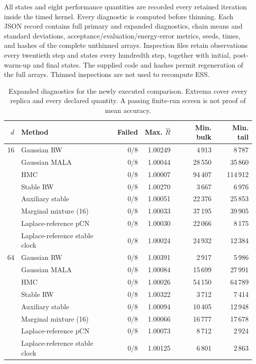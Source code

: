 \documentclass[11pt]{article}
\theoremstyle{definition}\newtheorem{definition}[theorem]{Definition}
\theoremstyle{remark}\newtheorem{remark}[theorem]{Remark}
\numberwithin{equation}{section}
\newcommand{\1}{\mathbf 1}
\begin{document}
All states and eight performance quantities are recorded every retained iteration inside the timed kernel. Every diagnostic is computed before thinning. Each JSON record contains full primary and expanded diagnostics, chain means and standard deviations, acceptance/evaluation/energy-error metrics, seeds, times, and hashes of the complete unthinned arrays. Inspection files retain observations every twentieth step and states every hundredth step, together with initial, post-warm-up and final states. The supplied code and hashes permit regeneration of the full arrays. Thinned inspections are not used to recompute ESS.
\begin{table}[tb]\centering\footnotesize\setlength{\tabcolsep}{4pt}
\caption{Expanded diagnostics for the newly executed comparison. Extrema cover every replica and every declared quantity. A passing finite-run screen is not proof of mean accuracy.}\label{tab:currentdiagnostics}
\begin{tabular}{rlrrrr}\toprule $d$&Method&Failed&Max. $\widehat R$&Min. bulk&Min. tail\\\midrule
16&Gaussian RW&0/8&1.00249&4\,913&8\,787\\
&Gaussian MALA&0/8&1.00044&28\,550&35\,860\\
&HMC&0/8&1.00007&94\,407&114\,912\\
&Stable RW&0/8&1.00270&3\,667&6\,976\\
&Auxiliary stable&0/8&1.00051&22\,376&25\,853\\
&Marginal mixture (16)&0/8&1.00033&37\,195&39\,905\\
&Laplace-reference pCN&0/8&1.00030&22\,066&8\,175\\
&Laplace-reference stable clock&0/8&1.00024&24\,932&12\,384\\
\midrule
64&Gaussian RW&0/8&1.00391&2\,917&5\,986\\
&Gaussian MALA&0/8&1.00084&15\,699&27\,991\\
&HMC&0/8&1.00026&54\,150&64\,789\\
&Stable RW&0/8&1.00322&3\,712&7\,414\\
&Auxiliary stable&0/8&1.00094&10\,405&12\,948\\
&Marginal mixture (16)&0/8&1.00066&16\,777&17\,678\\
&Laplace-reference pCN&0/8&1.00073&8\,712&2\,924\\
&Laplace-reference stable clock&0/8&1.00125&6\,801&2\,863\\
\bottomrule\end{tabular}\end{table}
\end{document}
